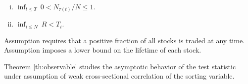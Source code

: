 
 
\begin{assumption}
\label{ass:exogenous} $ $

\begin{enumerate}[(i)]
\item $\inf_{t \leq T} \ 0< N_{\tau(t)}/N \leq 1.$ \label{ass:exogenous, i}

\item $\inf_{i\leq N} \ R < T_{i}$. \label{ass:exogenous, ii}
\end{enumerate}
\end{assumption}

\noindent
Assumption  requires that a positive fraction of all stocks is traded at any time. Assumption  imposes a lower bound on the lifetime of each stock.

Theorem \ref{th:observable} studies the asymptotic behavior of the test statistic under assumption  of weak cross-sectional correlation of the sorting variable.


